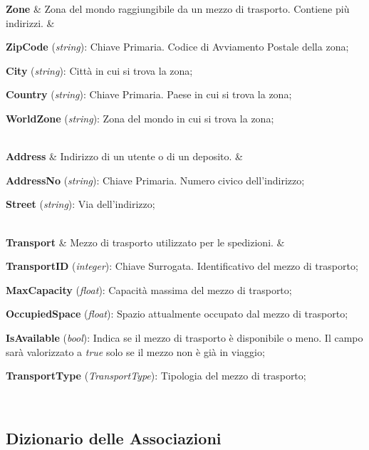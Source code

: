 {  \textbf{Zone} & Zona del mondo raggiungibile da un mezzo di trasporto. Contiene più indirizzi. &
  {\footnotesize
  \textbf{ZipCode} (\textit{string}): Chiave Primaria. Codice di Avviamento Postale della zona;

  \textbf{City} (\textit{string}): Città in cui si trova la zona;

  \textbf{Country} (\textit{string}): Chiave Primaria. Paese in cui si trova la zona;
  
  \textbf{WorldZone} (\textit{string}): Zona del mondo in cui si trova la zona;
  }\\

  \textbf{Address} & Indirizzo di un utente o di un deposito. & 
  {\footnotesize

  \textbf{AddressNo} (\textit{string}): Chiave Primaria. Numero civico dell'indirizzo; 

  \textbf{Street} (\textit{string}): Via dell'indirizzo;
  }\\

  \textbf{Transport} & Mezzo di trasporto utilizzato per le spedizioni. & 
  {\footnotesize
  \textbf{TransportID} (\textit{integer}): Chiave Surrogata. Identificativo del mezzo di trasporto;

  \textbf{MaxCapacity} (\textit{float}): Capacità massima del mezzo di trasporto;

  \textbf{OccupiedSpace} (\textit{float}): Spazio attualmente occupato dal mezzo di trasporto;

  \textbf{IsAvailable} (\textit{bool}): Indica se il mezzo di trasporto è disponibile o meno. Il campo sarà valorizzato a \textit{true} solo se il mezzo non è già in viaggio;
  
  \textbf{TransportType} (\textit{TransportType}): Tipologia del mezzo di trasporto;
  }\\

}

\newpage
\subsection{Dizionario delle Associazioni}

